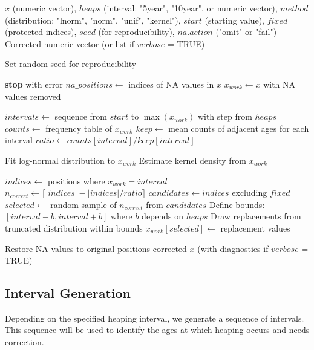 \documentclass[pdflatex,sn-mathphys-num]{sn-jnl}%
\theoremstyle{thmstyleone}%
\theoremstyle{thmstyletwo}%
\theoremstyle{thmstylethree}%
\begin{document}
\begin{algorithm}
\caption{Correct Heaping}\label{alg:correctHeaps}
\begin{algorithmic}[1]
\Require $x$ (numeric vector), $heaps$ (interval: "5year", "10year", or numeric vector), $method$ (distribution: "lnorm", "norm", "unif", "kernel"), $start$ (starting value), $fixed$ (protected indices), $seed$ (for reproducibility), $na.action$ ("omit" or "fail")
\Ensure Corrected numeric vector (or list if $verbose$ = TRUE)

    \State Set random seed for reproducibility
\EndIf

    \State \textbf{stop} with error
\EndIf
\State $na\_positions \gets$ indices of NA values in $x$
\State $x_{work} \gets x$ with NA values removed

\State $intervals \gets$ sequence from $start$ to $\max(x_{work})$ with step from $heaps$
\State $counts \gets$ frequency table of $x_{work}$
\State $keep \gets$ mean counts of adjacent ages for each interval
\State $ratio \gets counts[interval] / keep[interval]$

    \State Fit log-normal distribution to $x_{work}$
    \State Estimate kernel density from $x_{work}$
\EndIf

    \State $indices \gets$ positions where $x_{work} = interval$
    \State $n_{correct} \gets \lceil |indices| - |indices|/ratio \rceil$
    \State $candidates \gets indices$ excluding $fixed$
    \State $selected \gets$ random sample of $n_{correct}$ from $candidates$
    \State Define bounds: $[interval - b, interval + b]$ where $b$ depends on $heaps$
    \State Draw replacements from truncated distribution within bounds
    \State $x_{work}[selected] \gets$ replacement values
\EndFor

\State Restore NA values to original positions
\State \Return corrected $x$ (with diagnostics if $verbose$ = TRUE)
\end{algorithmic}
\end{algorithm}


\subsection{Interval Generation}

Depending on the specified heaping interval, we generate a sequence of intervals. This sequence will be used to identify the ages at which heaping occurs and needs correction.
\end{document}
